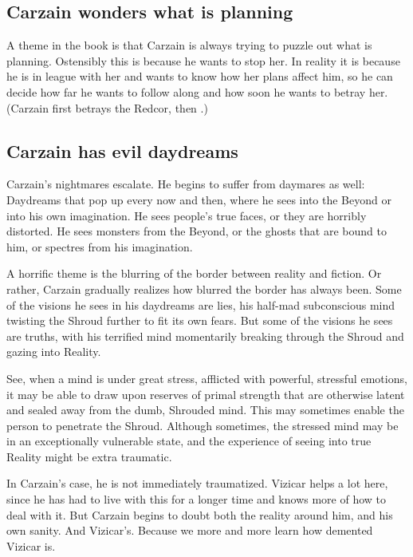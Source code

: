 \subsection{Carzain wonders what \Belzir is planning}
A theme in the book is that Carzain is always trying to puzzle out what \Belzir is planning. 
Ostensibly this is because he wants to stop her.
In reality it is because he is in league with her and wants to know how her plans affect him, so he can decide how far he wants to follow along and how soon he wants to betray her.
(Carzain first betrays the Redcor, then \Belzir.)









\subsection{Carzain has evil daydreams}
Carzain's nightmares escalate. He begins to suffer from daymares as well: Daydreams that pop up every now and then, where he sees into the Beyond or into his own imagination. He sees people's true faces, or they are horribly distorted. He sees monsters from the Beyond, or the ghosts that are bound to him, or spectres from his imagination. 

A horrific theme is the blurring of the border between reality and fiction. Or rather, Carzain gradually realizes how blurred the border has always been. Some of the visions he sees in his daydreams are lies, his half-mad subconscious mind twisting the Shroud further to fit its own fears. But some of the visions he sees are truths, with his terrified mind momentarily breaking through the Shroud and gazing into Reality. 

See, when a mind is under great stress, afflicted with powerful, stressful emotions, it may be able to draw upon reserves of primal strength that are otherwise latent and sealed away from the dumb, Shrouded mind. This may sometimes enable the person to penetrate the Shroud. Although sometimes, the stressed mind may be in an exceptionally vulnerable state, and the experience of seeing into true Reality might be extra traumatic. 

In Carzain's case, he is not immediately traumatized. Vizicar helps a lot here, since he has had to live with this for a longer time and knows more of how to deal with it. But Carzain begins to doubt both the reality around him, and his own sanity. And Vizicar's. Because we more and more learn how demented Vizicar is. 

